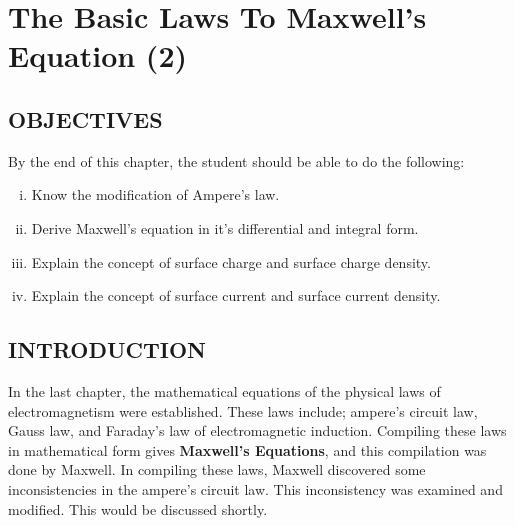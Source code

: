 \chapter{The Basic Laws To Maxwell's Equation (2)}\label{lec:lec19}

\section{OBJECTIVES}
\begin{mdframed}[backgroundcolor=lightblue, linewidth=1pt, hidealllines=true]
By the end of this chapter, the student should be able to do the following:
	\begin{enumerate}[(i)]
		\item Know the modification of Ampere's law. 
		
		\item Derive Maxwell's equation in it's differential and integral form.
		
		\item Explain the concept of surface charge and surface charge density. 
		
		\item Explain the concept of surface current and surface current density.
	\end{enumerate}
\end{mdframed}

\section{INTRODUCTION}
In the last chapter, the mathematical equations of the physical laws of electromagnetism were established. These laws include; ampere's circuit law, Gauss law, and Faraday's law of electromagnetic induction. Compiling these laws in mathematical form gives \textbf{Maxwell's Equations}, and this compilation was done by Maxwell. In compiling these laws, Maxwell discovered some inconsistencies in the ampere's circuit law. This inconsistency was examined and modified. This would be discussed shortly.


